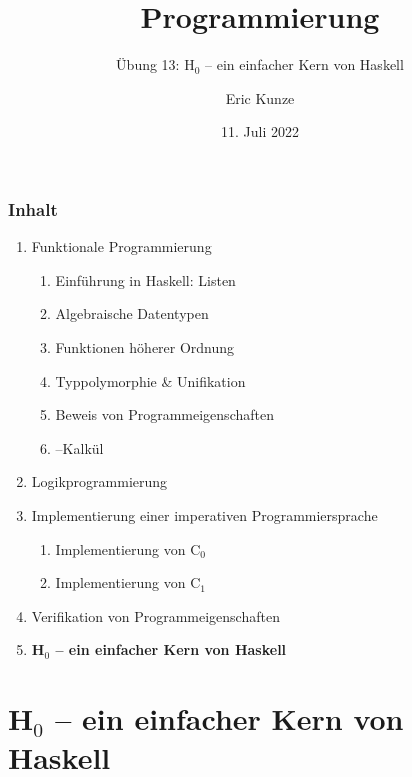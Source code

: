 \documentclass{beamer}
\begin{document}
	
	\title{Programmierung}
	\subtitle{Übung 13: H${}_{\text{0}}$ -- ein einfacher Kern von Haskell}
	\author{Eric Kunze}
	\date{11. Juli 2022}
	
	\maketitle
	


\begin{frame}[fragile] \frametitle{Inhalt}
	\begin{enumerate}
		\item Funktionale Programmierung
		\begin{enumerate}
			\item Einführung in Haskell: Listen
			\item Algebraische Datentypen
			\item Funktionen höherer Ordnung
			\item Typpolymorphie \& Unifikation
			\item Beweis von Programmeigenschaften
			\item \textlambda--Kalkül
		\end{enumerate}
		\item Logikprogrammierung
		\item Implementierung einer imperativen Programmiersprache
		\begin{enumerate}
			\item Implementierung von C${}_\text{0}$
			\item Implementierung von C${}_\text{1}$
		\end{enumerate}
		\item Verifikation von Programmeigenschaften
		\item \textbf{H${}_\text{0}$ -- ein einfacher Kern von Haskell}
	\end{enumerate}
\end{frame}


\section{H${}_\text{0}$ -- ein einfacher Kern von Haskell}
\end{document}
